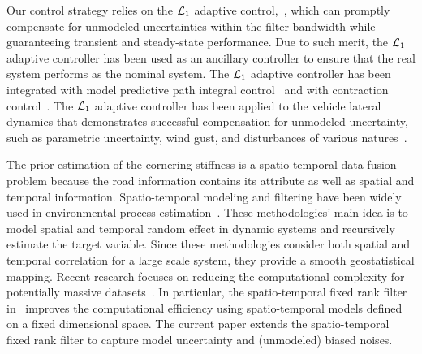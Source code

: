 \documentclass[letterpaper, 10 pt, conference]{ieeeconf}
\begin{document}
Our control strategy relies on the $\mathcal{L}_1$ adaptive control,~\cite{cao2008design,hovakimyan2010L1}, which can promptly compensate for unmodeled uncertainties within the filter bandwidth while guaranteeing transient and steady-state performance. 
Due to such merit, the $\mathcal{L}_1$ adaptive controller has been used as an ancillary controller to ensure that the real system performs as the nominal system. The $\mathcal{L}_1$ adaptive controller has been integrated with model predictive path integral control~\cite{pravitra2020l1} and with contraction control~\cite{lakshmanan2020safe,gahlawat2020mathcal}.
The $\mathcal{L}_1$ adaptive controller has been applied to the vehicle lateral dynamics that demonstrates  successful compensation for unmodeled uncertainty, such as parametric uncertainty, wind gust, and disturbances of various natures~\cite{shirazi2017mathcal}.

The prior estimation of the cornering stiffness is a spatio-temporal data fusion problem because the road information contains its attribute as well as spatial and temporal information.
Spatio-temporal modeling and filtering have been widely used in environmental process estimation~\cite{evensen2009data}.
These methodologies' main idea is to model spatial and temporal random effect in dynamic systems and recursively estimate the target variable.
Since these methodologies consider both spatial and temporal correlation for a large scale system, they provide a smooth geostatistical mapping.
Recent research focuses on reducing the computational complexity for potentially massive datasets~\cite{hunt2007efficient,cressie2010fixed,nguyen2014spatio}.
In particular, the spatio-temporal fixed rank filter in~\cite{cressie2010fixed} improves the computational efficiency using spatio-temporal models defined on a fixed dimensional space.
The current paper extends the spatio-temporal fixed rank filter to capture model uncertainty and (unmodeled) biased noises.


\end{document}
